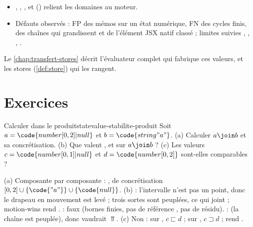 \begin{resume}
\begin{itemize}
     (motion-wins, où  ne veut dire que
    \og peut changer à chaque rendu\fg{}) et .
  \item {}, , ,
     et  ()
    relient les domaines au moteur.
  \item Défauts observés : FP des mémos sur un état numérique, FN des cycles
    finis, des chaînes qui grandissent et de l'élément JSX natif classé
     ; limites suivies , , ,
    .
\end{itemize}
Le \cref{chap:transfert-stores} décrit l'évaluateur complet qui fabrique ces
valeurs, et les stores (\cref{def:store}) qui les rangent.
\end{resume}

\section*{Exercices}

\begin{exercice}{Calculer dans le produit}{statevalue-stabilite-produit}
  Soit $a = \code{number[0, 2]|null}$ et $b = \code{string{"a"}}$.
  (a) Calculer $a \join b$ et sa concrétisation. (b) Que valent
  ,  et  sur
  $a \join b$ ? (c) Les valeurs $c = \code{number[0, 1]|null}$ et
  $d = \code{number[0, 2]}$ sont-elles comparables ?
\end{exercice}
\begin{solution}
  (a) Composante par composante : , de
  concrétisation $[0,2] \cup \{\code{"a"}\} \cup \{\code{null}\}$.
  (b)  : l'intervalle n'est pas un point, donc le drapeau
  \og en mouvement\fg{} est levé ; trois sortes sont peuplées, ce qui joint
   ; motion-wins rend .  :
  faux (bornes finies, pas de référence , pas de résidu).
   :  (la chaîne est peuplée), donc 
  vaudrait $\Top$. (c) Non : sur , $c \sqsubset d$ ; sur
  , $c \sqsupset d$ ;  rend .
\end{solution}

